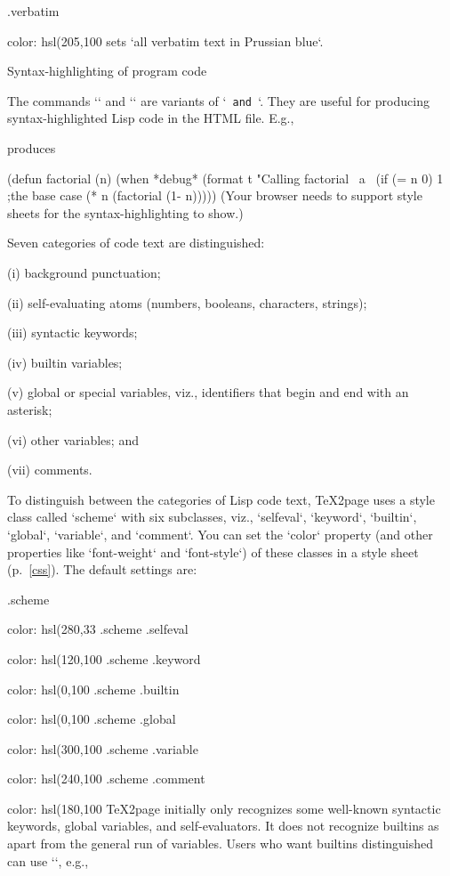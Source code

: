 \begintt
.verbatim        {color: hsl(205,100%
\endtt
%
sets {\color[Hsl]{205,1,.16} `all verbatim text
in Prussian blue`}.

\beginsection Syntax-highlighting of program code

%
The commands `\scm` and `\scminput` are variants
of `\verb` and ``.  They are
useful for producing syntax-highlighted Lisp
code in the HTML file.  E.g.,

\begintt
{}
\endtt
\ifx\shipout\UnDeFiNeD %
produces

\begintts
(defun factorial (n)
  (when *debug*
    (format t "Calling factorial ~a~%
  (if (= n 0) 1 ;the base case
      (* n (factorial (1- n)))))
\endtt
(Your browser needs to support style sheets for the
syntax-highlighting to show.)
\fi

Seven categories of code text are distinguished:

(i) background punctuation;

(ii) self-evaluating atoms (numbers, booleans, characters, strings);

(iii) syntactic keywords;

(iv) builtin variables;

(v) global or special variables, viz., identifiers that begin and end with an asterisk;

(vi) other variables; and

(vii) comments.

To distinguish between the categories of Lisp code
text, \TeX2page uses a style class called `scheme`
with six subclasses, viz., `selfeval`,
`keyword`, `builtin`, `global`, `variable`, and
`comment`.  You can set the `color` property (and
other properties like `font-weight` and
`font-style`) of these classes in a style
sheet (p.~\ref{css}).  The default settings are:

\begintt
.scheme             {color: hsl(280,33%
.scheme  .selfeval  {color: hsl(120,100%
.scheme  .keyword   {color: hsl(0,100%
.scheme  .builtin   {color: hsl(0,100%
.scheme  .global    {color: hsl(300,100%
.scheme  .variable  {color: hsl(240,100%
.scheme  .comment   {color: hsl(180,100%
\endtt
%
%
\TeX2page initially only recognizes some well-known
syntactic keywords, global variables, and
self-evaluators.  It does not recognize builtins as
apart from the general run of variables.  Users who
want builtins distinguished can use
`\scmbuiltin`, e.g.,

}}}}}}}}
